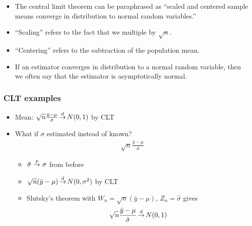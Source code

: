 \begin{frame}[allowframebreaks]
\begin{itemize}
\item The central limit theorem can be paraphrased as ``scaled and centered
sample means converge in distribution to normal random
variables.'' 

\item ``Scaling'' refers to the fact that we multiple by
$\sqrt{n}$. 

\item ``Centering'' refers to the subtraction of the population
mean. 

\item If an estimator converges in distribution to a normal
random variable, then we often say that the estimator is
asymptotically normal. 
 \end{itemize}
\end{frame}







\begin{frame}[allowframebreaks]
  \frametitle{CLT examples}
  \begin{itemize}
  \item Mean: $\sqrt{n}\frac{\bar{y} - \mu}{\sigma} \indist N(0,1)$ by CLT
  \item What if $\sigma$ estimated instead of known? 
    \begin{align*}
      \sqrt{n} \frac{\bar{y} - \mu}{\hat{\sigma}} 
    \end{align*}
    \begin{itemize}
    \item $\hat{\sigma} \inprob \sigma$ from before
    \item $\sqrt{n}(\bar{y} - \mu) \indist N(0,\sigma^2)$ by CLT
    \item Slutsky's theorem  with $W_n = \sqrt{n}(\bar{y} - \mu)$,
      $Z_n = \hat{\sigma}$ gives
      \[ \sqrt{n} \frac{\bar{y} - \mu}{\hat{\sigma}} \indist N(0,1) \]
    \end{itemize}
  \end{itemize}
\end{frame}

